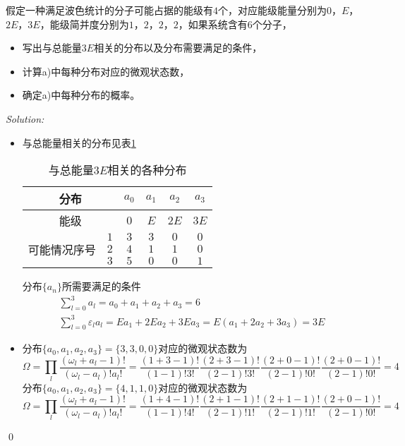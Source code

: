 \documentclass[12pt,a4paper]{article}
\newenvironment{problem}[2][Problem]{\begin{trivlist}
\item[\hskip \labelsep {\bfseries #1}\hskip \labelsep {\bfseries #2.}]}{\end{trivlist}}
\newenvironment{sol}
    {\emph{Solution:}
    }
    {
    \qed
    }
\begin{document}
\begin{problem}{*}
假定一种满足波色统计的分子可能占据的能级有$4$个，对应能级能量分别为$0$，$E$，$2E$，$3E$，能级简并度分别为$1$，$2$，$2$，$2$，如果系统含有$6$个分子，
\begin{itemize}
\item[a.] 写出与总能量$3E$相关的分布以及分布需要满足的条件，
\item[b.] 计算a)中每种分布对应的微观状态数，
\item[c.] 确定a)中每种分布的概率。
\end{itemize}
\end{problem}
\begin{sol}
\begin{itemize}
\item[a.] 与总能量相关的分布见表\ref{3E1}
\begin{table}[h]
\centering
\caption{与总能量$3E$相关的各种分布}
\label{3E1}
\begin{tabular}{|c|c|c|c|c|c|}
\hline
\multicolumn{2}{|c|}{分布}      & $a_0$ & $a_1$ & $a_2$ & $a_3$ \\ \hline
\multicolumn{2}{|c|}{能级}      & $0$   & $E$   & $2E$  & $3E$  \\ \hline
\multirow{3}{*}{可能情况序号} & $1$ & $3$   & $3$   & $0$   & $0$   \\ \cline{2-6} 
                        & $2$ & $4$   & $1$   & $1$   & $0$   \\ \cline{2-6} 
                        & $3$ & $5$   & $0$   & $0$   & $1$   \\ \hline
\end{tabular}
\end{table}
分布$\{a_n\}$所需要满足的条件
\begin{gather}
\sum_{l=0}^{3}a_l=a_0+a_1+a_2+a_3=6\\
\sum_{l=0}^{3}\varepsilon_la_l=Ea_1+2Ea_2+3Ea_3=E(a_1+2a_2+3a_3)=3E
\end{gather}
\item[b.] 分布$\{a_0,a_1,a_2,a_3\}=\{3,3,0,0\}$对应的微观状态数为
\begin{equation}
\Omega=\prod_l\frac{(\omega_l+a_l-1)!}{(\omega_l-a_l)!a_l!}=\frac{(1+3-1)!}{(1-1)!3!}\frac{(2+3-1)!}{(2-1)!3!}\frac{(2+0-1)!}{(2-1)!0!}\frac{(2+0-1)!}{(2-1)!0!}=4
\end{equation}
分布$\{a_0,a_1,a_2,a_3\}=\{4,1,1,0\}$对应的微观状态数为
\begin{equation}
\Omega=\prod_l\frac{(\omega_l+a_l-1)!}{(\omega_l-a_l)!a_l!}=\frac{(1+4-1)!}{(1-1)!4!}\frac{(2+1-1)!}{(2-1)!1!}\frac{(2+1-1)!}{(2-1)!1!}\frac{(2+0-1)!}{(2-1)!0!}=4

\end{equation}
\end{itemize}
\end{sol}
\end{document}
